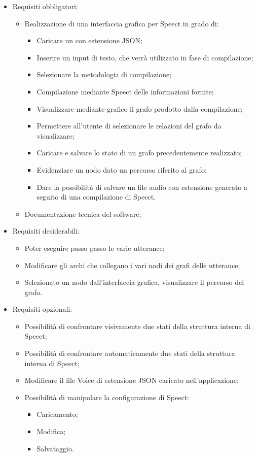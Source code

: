 \documentclass[../AnalisideiRequisiti.tex]{subfiles}
\begin{document}
\begin{itemize}
	\item{} Requisiti obbligatori:
	\begin{itemize}
		\item{}Realizzazione di una interfaccia grafica per Speect in grado di:
		\begin{itemize}
			\item{}Caricare un  con estensione JSON;
			\item{} Inserire un input di testo, che verrà utilizzato in fase di compilazione;
			\item{} Selezionare la metodologia di compilazione;
			\item{} Compilazione mediante Speect delle informazioni fornite;
			\item{} Visualizzare mediante grafico il grafo prodotto dalla compilazione;
			\item{} Permettere all'utente di selezionare le relazioni del grafo da visualizzare;
			\item{} Caricare e salvare lo stato di un grafo precedentemente realizzato;
			\item{} Evidenziare un nodo dato un percorso riferito al grafo;
			\item{} Dare la possibilità di salvare un file audio con estensione  generato a seguito di una compilazione di Speect.
		\end{itemize}
		\item{}	Documentazione tecnica del software;
	\end{itemize}
	\item{} Requisiti desiderabili:
	\begin{itemize}
		\item{} Poter eseguire passo passo le varie utterance;
		\item{}	Modificare gli archi che collegano i vari nodi dei grafi delle utterance;
		\item{} Selezionato un nodo dall'interfaccia grafica, visualizzare il percorso del grafo.
	\end{itemize}
	\item{} Requisiti opzionali:
	\begin{itemize}
		\item{}	Possibilità di confrontare visivamente due stati della struttura interna di Speect;
		\item{} Possibilità di confrontare automaticamente due stati della struttura interna di Speect;
		\item{}Modificare il file Voice di estensione JSON caricato nell'applicazione;
		\item{}	Possibilità di manipolare la configurazione di Speect:
		\begin{itemize}
			\item{} Caricamento;
			\item{}	Modifica;
			\item{} Salvataggio.
		\end{itemize}
	\end{itemize}
	
\end{itemize}
\end{document}
